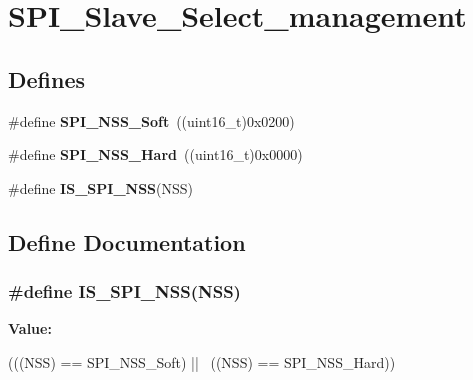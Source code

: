 \hypertarget{group__SPI__Slave__Select__management}{
\section{SPI\_\-Slave\_\-Select\_\-management}
\label{group__SPI__Slave__Select__management}
}
\subsection*{Defines}
\begin{DoxyCompactItemize}
\item 
\hypertarget{group__SPI__Slave__Select__management_ga105969ee7eb635414da35b41e942e383}{
\#define {\bfseries SPI\_\-NSS\_\-Soft}~((uint16\_\-t)0x0200)}
\label{group__SPI__Slave__Select__management_ga105969ee7eb635414da35b41e942e383}

\item 
\hypertarget{group__SPI__Slave__Select__management_ga07c547459d39fb7a6e0322147a60b74a}{
\#define {\bfseries SPI\_\-NSS\_\-Hard}~((uint16\_\-t)0x0000)}
\label{group__SPI__Slave__Select__management_ga07c547459d39fb7a6e0322147a60b74a}

\item 
\#define {\bfseries IS\_\-SPI\_\-NSS}(NSS)
\end{DoxyCompactItemize}


\subsection{Define Documentation}
\hypertarget{group__SPI__Slave__Select__management_gabbeedf42eccef1bae4f88c606fc3b261}{
\subsubsection[{IS\_\-SPI\_\-NSS}]{\setlength{\rightskip}{0pt plus 5cm}\#define IS\_\-SPI\_\-NSS(NSS)}}
\label{group__SPI__Slave__Select__management_gabbeedf42eccef1bae4f88c606fc3b261}
{\bfseries Value:}
\begin{DoxyCode}
(((NSS) == SPI_NSS_Soft) || \
                         ((NSS) == SPI_NSS_Hard))
\end{DoxyCode}
